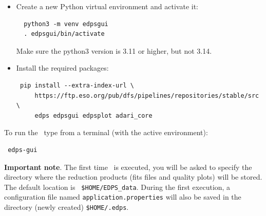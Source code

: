 \begin{itemize}

\item Create a new Python virtual environment and activate it:
\begin{verbatim}
  python3 -m venv edpsgui
  . edpsgui/bin/activate
\end{verbatim}
Make sure the python3 version is 3.11 or higher, but not 3.14.

\item Install the required packages:
\begin{verbatim}
 pip install --extra-index-url \
     https://ftp.eso.org/pub/dfs/pipelines/repositories/stable/src \
     edps edpsgui edpsplot adari_core 
\end{verbatim}
\end{itemize}

To run the \edpsgui\ type from a terminal (with the active environment):
\begin{verbatim}
 edps-gui
\end{verbatim}

{\bf Important note}. The first time \edpsgui\ is executed, you will
be asked to specify the directory where the reduction products (fits
files and quality plots) will be stored. The default location is {\tt
  \$HOME/EDPS\_data}. During the first execution, a configuration file
named {\tt application.properties} will also be saved in the directory
(newly created) {\tt \$HOME/.edps}.

